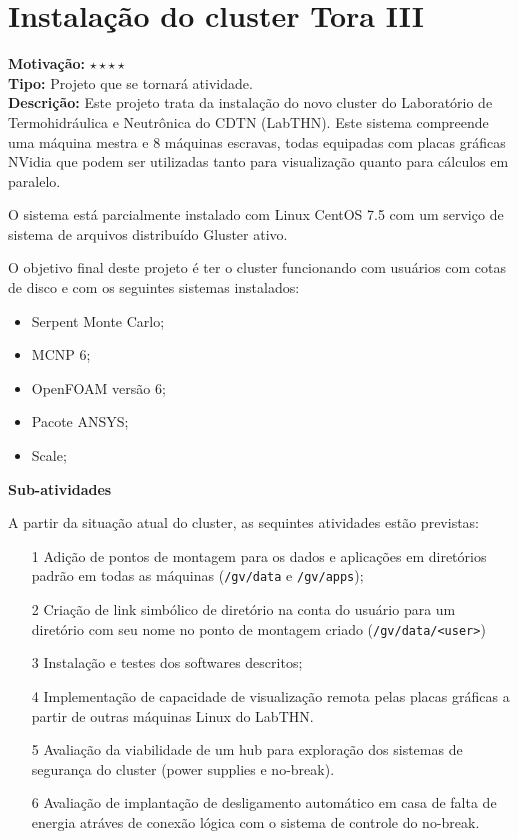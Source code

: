 \chapter{Instalação do cluster Tora III}

\textbf{Motivação:} $\star\star\star\star$\\

\textbf{Tipo:} Projeto que se tornará atividade.\\

\textbf{Descrição:} Este projeto trata da instalação do novo cluster do Laboratório 
de Termohidráulica e Neutrônica do CDTN (LabTHN). Este sistema compreende uma máquina 
mestra e 8 máquinas escravas, todas equipadas com placas gráficas NVidia que podem 
ser utilizadas tanto para visualização quanto para cálculos em paralelo.

O sistema está parcialmente instalado com Linux CentOS 7.5 com um serviço de 
sistema de arquivos distribuído Gluster ativo. 

O objetivo final deste projeto é ter o cluster funcionando com usuários com cotas 
de disco e com os seguintes sistemas instalados:

\begin{itemize}
	\item Serpent Monte Carlo;
	\item MCNP 6;
	\item OpenFOAM versão 6;
	\item Pacote ANSYS;
	\item Scale;
\end{itemize}

\textbf{Sub-atividades}

A partir da situação atual do cluster, as sequintes atividades estão previstas:
\begin{itemize}
	\item[1] Adição de pontos de montagem para os dados e aplicações em diretórios 
	padrão em todas as máquinas (\texttt{/gv/data} e \texttt{/gv/apps});
	\item[2] Criação de link simbólico de diretório na conta do usuário para um 
	diretório com seu nome no ponto de montagem criado (\texttt{/gv/data/<user>})
	\item[3] Instalação e testes dos softwares descritos;
	\item[4] Implementação de capacidade de visualização remota pelas placas gráficas a partir de outras máquinas Linux do LabTHN.
	\item[5] Avaliação da viabilidade de um hub para exploração dos sistemas de segurança do cluster (power supplies e no-break).
	\item[6] Avaliação de implantação de desligamento automático em casa de falta de energia atráves de conexão lógica com o sistema de controle do no-break.
\end{itemize}

